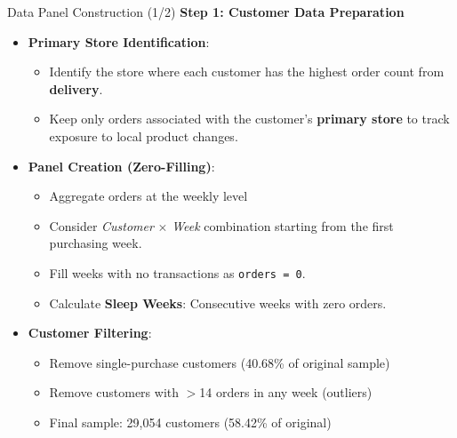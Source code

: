 \documentclass[aspectratio=169]{beamer}  %
\begin{document}

\begin{frame}{Data Panel Construction (1/2)}
    \textbf{Step 1: Customer Data Preparation}
    \begin{itemize}
        \item \textbf{Primary Store Identification}:
        \begin{itemize}
            \item Identify the store where each customer has the highest order count from \textbf{delivery}.
            \item Keep only orders associated with the customer's \textbf{primary store} to track exposure to local product changes.
        \end{itemize}
        \item \textbf{Panel Creation (Zero-Filling)}:
        \begin{itemize}
            \item Aggregate orders at the weekly level
            \item Consider \textit{Customer} $\times$ \textit{Week} combination starting from the first purchasing week.
            \item Fill weeks with no transactions as \texttt{orders = 0}.
            \item Calculate \textbf{Sleep Weeks}: Consecutive weeks with zero orders.
        \end{itemize}
        \item \textbf{Customer Filtering}:
        \begin{itemize}
            \item Remove single-purchase customers (40.68\% of original sample)
            \item Remove customers with $>$14 orders in any week (outliers)
            \item Final sample: 29,054 customers (58.42\% of original)
        \end{itemize}
    \end{itemize}
\end{frame}
\end{document}
